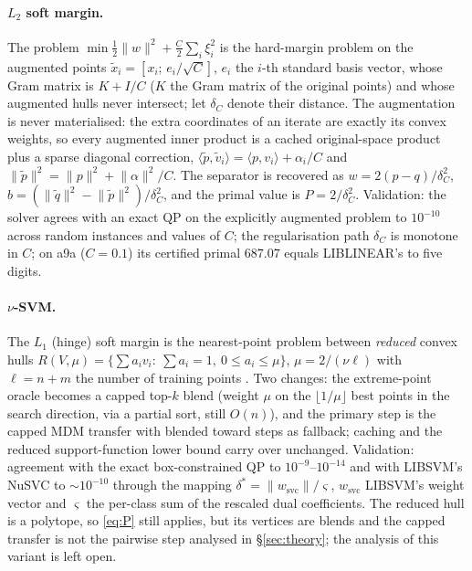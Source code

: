 \documentclass{opt2026}   %
\newcommand{\ip}[2]{\langle #1, #2 \rangle}
\newcommand{\norm}[1]{\lVert #1 \rVert}
\begin{document}
\paragraph{$L_2$ soft margin.} The problem
$\min\tfrac12\norm w^2+\tfrac C2\sum_i\xi_i^2$ is the hard-margin problem
on the augmented points $\tilde x_i=[x_i;\,e_i/\sqrt C]$, $e_i$ the
$i$-th standard basis vector, whose Gram
matrix is $K+I/C$ ($K$ the Gram matrix of the original points) and whose
augmented hulls never intersect; let $\delta_C$ denote their distance. The
augmentation is never materialised: the extra coordinates of an iterate
are exactly its convex weights, so every augmented inner product is a
cached original-space product plus a sparse diagonal correction,
$\ip{\tilde p}{\tilde v_i}=\ip{p}{v_i}+\alpha_i/C$ and
$\norm{\tilde p}^2=\norm p^2+\norm\alpha^2/C$. The separator is recovered
as $w=2(p-q)/\delta_C^2$, $b=(\norm{\tilde q}^2-\norm{\tilde p}^2)/\delta_C^2$,
and the primal value is $P=2/\delta_C^2$. Validation: the solver agrees
with an exact QP on the explicitly augmented problem to $10^{-10}$
across random instances and values of $C$; the regularisation path
$\delta_C$ is monotone in $C$; on a9a ($C{=}0.1$) its certified primal
$687.07$ equals LIBLINEAR's to five digits.

\paragraph{$\nu$-SVM.} The $L_1$ (hinge) soft margin is the nearest-point
problem between \emph{reduced} convex hulls
$R(V,\mu)=\{\sum a_iv_i:\ \sum a_i=1,\ 0\le a_i\le\mu\}$,
$\mu=2/(\nu\ell)$ with $\ell=n+m$ the number of training points
\cite{bennett2000duality}. Two changes: the
extreme-point oracle becomes a capped top-$k$ blend (weight $\mu$ on the
$\lfloor1/\mu\rfloor$ best points in the search direction, via a partial
sort, still $O(n)$), and the primary step is the capped MDM transfer with
blended toward steps as fallback; caching and the reduced
support-function lower bound carry over unchanged. Validation: agreement
with the exact box-constrained QP to $10^{-9}$--$10^{-14}$ and with
LIBSVM's NuSVC to $\sim10^{-10}$ through the mapping
$\delta^*=\norm{w_{\mathrm{svc}}}/\varsigma$, $w_{\mathrm{svc}}$ LIBSVM's
weight vector and $\varsigma$ the per-class
sum of the rescaled dual coefficients. The reduced hull is a polytope, so
\eqref{eq:P} still applies, but its vertices are blends and the capped
transfer is not the pairwise step analysed in \S\ref{sec:theory}; the
analysis of this variant is left open.
\end{document}
